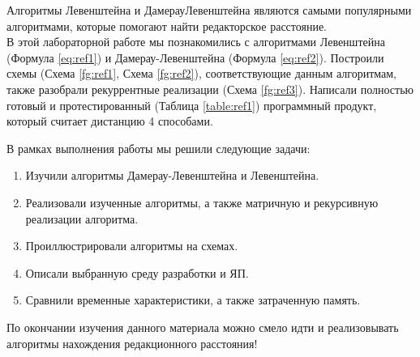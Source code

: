 \Conclusion %

Алгоритмы Левенштейна и ДамерауЛевенштейна являются самыми популярными алгоритмами, которые помогают найти редакторское расстояние. \\
В этой лабораторной работе мы познакомились с алгоритмами Левенштейна (Формула \ref{eq:ref1}) и Дамерау-Левенштейна (Формула \ref{eq:ref2}).
Построили схемы (Схема \ref{fg:ref1}, Схема \ref{fg:ref2}), соответствующие данным алгоритмам, также разобрали рекуррентные реализации (Схема \ref{fg:ref3}).
Написали полностью готовый и протестированный (Таблица \ref{table:ref1}) программный продукт, который считает дистанцию 4 способами.

В рамках выполнения работы мы решили следующие задачи:

\begin{enumerate}
	\item Изучили алгоритмы Дамерау-Левенштейна и Левенштейна.
	\item Реализовали изученные алгоритмы, а также матричную и рекурсивную реализации алгоритма.
	\item Проиллюстрировали алгоритмы на схемах.
	\item Описали выбранную среду разработки и ЯП.
	\item Сравнили временные характеристики, а также затраченную память.
\end{enumerate}

По окончании изучения данного материала можно смело идти и реализовывать алгоритмы нахождения редакционного расстояния!